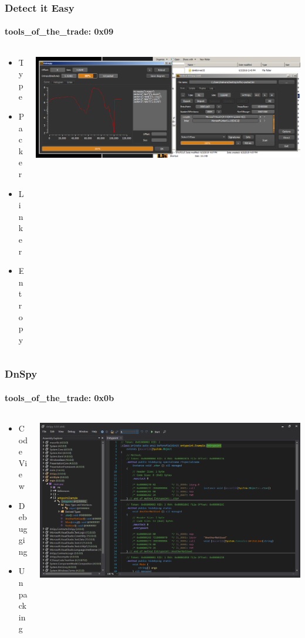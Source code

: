 \documentclass[aspectratio=169]{beamer}
\begin{document}
\begin{frame}
  \frametitle{Detect it Easy}
  \framesubtitle{tools\_of\_the\_trade: 0x09}
  \begin{columns}
    \begin{column}{.2\textwidth}
      \begin{itemize}
      \item{Type}
      \item{Packer}
      \item{Linker}
      \item{Entropy}
      \end{itemize}
    \end{column}
    \hfill
    \begin{column}{.8\textwidth}
      \includegraphics[scale=.98]{detect-it-easy}
    \end{column}
  \end{columns}
\end{frame}

\begin{frame}
  \frametitle{DnSpy}
  \framesubtitle{tools\_of\_the\_trade: 0x0b}
  \begin{columns}
    \begin{column}{.3\textwidth}
      \begin{itemize}
        \item{Code View}
        \item{Debugging}
        \item{Unpacking}
      \end{itemize}
    \end{column}
    \hfill
    \begin{column}{.7\textwidth}
      \includegraphics[scale=0.22]{dnspy}
    \end{column}
  \end{columns}
\end{frame}
\end{document}

